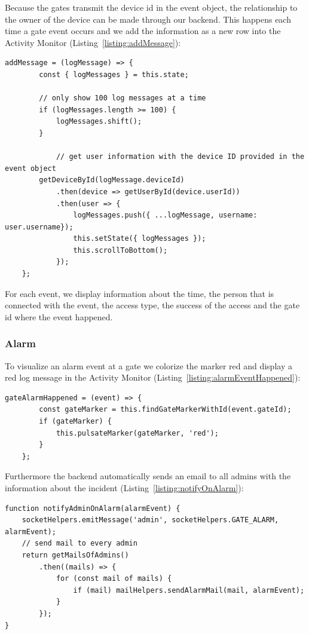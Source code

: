 Because the gates transmit the device id in the event object, the relationship to the owner of the device can be made through our backend. This happens each time a gate event occurs and we add the information as a new row into the Activity Monitor (Listing~\ref{listing:addMessage}):

\begin{lstlisting}[label={listing:addMessage},caption={Function for adding message to Activity Monitor}]
addMessage = (logMessage) => {
        const { logMessages } = this.state;
        
        // only show 100 log messages at a time
        if (logMessages.length >= 100) {
            logMessages.shift();
        }

            // get user information with the device ID provided in the event object
        getDeviceById(logMessage.deviceId)
            .then(device => getUserById(device.userId))
            .then(user => {
                logMessages.push({ ...logMessage, username: user.username});
                this.setState({ logMessages });
                this.scrollToBottom();
            });
    };
\end{lstlisting}

For each event, we display information about the time, the person that is connected with the event, the access type, the success of the access and the gate id where the event happened.

\subsubsection{Alarm}

To visualize an alarm event at a gate we colorize the marker red and display a red log message in the Activity Monitor (Listing~\ref{listing:alarmEventHappened}):

\begin{lstlisting}[label={listing:alarmEventHappened},caption={Handling gate alarm events in frontend}]
gateAlarmHappened = (event) => {
        const gateMarker = this.findGateMarkerWithId(event.gateId);
        if (gateMarker) {
            this.pulsateMarker(gateMarker, 'red');
        }
    };
\end{lstlisting}

Furthermore the backend automatically sends an email to all admins with the information about the incident (Listing~\ref{listing:notifyOnAlarm}):

\begin{lstlisting}[label={listing:notifyOnAlarm},caption={Notifying admins on alarm event}]
function notifyAdminOnAlarm(alarmEvent) {
    socketHelpers.emitMessage('admin', socketHelpers.GATE_ALARM, alarmEvent);
    // send mail to every admin
    return getMailsOfAdmins()
        .then((mails) => {
            for (const mail of mails) {
                if (mail) mailHelpers.sendAlarmMail(mail, alarmEvent);
            }
        });
}
\end{lstlisting}

\clearpage
